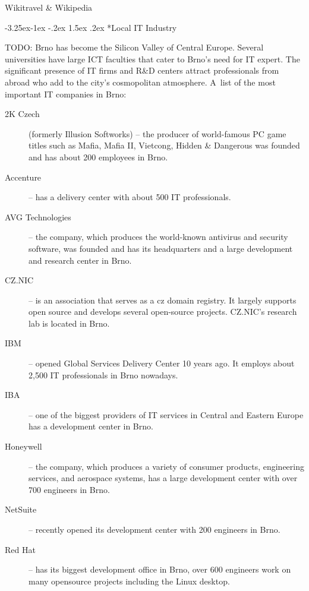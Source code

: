 \documentclass[10pt,a4paper]{article}
\makeatletter
\renewcommand\subsection{%
\@startsection{subsection}{2}{\z@}%
              {-3.25ex\@plus -1ex \@minus -.2ex}%
              {1.5ex \@plus .2ex}%
              {\color{kdelight}\sffamily\Large\bfseries}}
\makeatother
\begin{document}
\begin{flushright}Wikitravel \& Wikipedia\end{flushright}

\subsection*{Local IT Industry}
TODO:
Brno has become the Silicon Valley of Central Europe. Several
universities have large ICT faculties that cater to Brno's need for IT
expert. The significant presence of IT firms and R\&D centers attract
professionals from abroad who add to the city's cosmopolitan
atmosphere. A~list of the most important IT companies in Brno:

\begin{description}
\item[\color{kdedarker} 2K Czech] (formerly Illusion Softworks) -- the producer of world-famous PC game titles such as Mafia, Mafia II, Vietcong, Hidden \& Dangerous was founded and has about 200 employees in Brno.
\item[\color{kdedarker} Accenture] -- has a delivery center with about 500 IT professionals.
\item[\color{kdedarker} AVG Technologies] -- the company, which produces the world-known antivirus and security software, was founded and has its headquarters and a large development and research center in Brno.
\item[\color{kdedarker} CZ.NIC] -- is an association that serves as a cz domain registry. It largely supports open source and develops several open-source projects. CZ.NIC's research lab is located in Brno.
\item[\color{kdedarker} IBM] -- opened Global Services Delivery Center 10 years ago. It employs about 2,500 IT professionals in Brno nowadays.
\item[\color{kdedarker} IBA] -- one of the biggest providers of IT services in Central and Eastern Europe has a development center in Brno.
\item[\color{kdedarker} Honeywell] -- the company, which produces a variety of consumer products, engineering services, and aerospace systems, has a large development center with over 700 engineers in Brno.
\item[\color{kdedarker} NetSuite] -- recently opened its development center with 200 engineers in Brno.
\item[\color{kdedarker} Red Hat] -- has its biggest development office in Brno, over 600 engineers work on many opensource projects including the Linux desktop.

\end{description}
\end{document}

